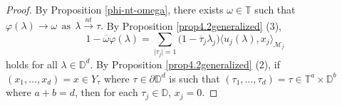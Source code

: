 \documentclass[10pt,a4paper]{amsart}
\begin{document}
\begin{proof}
 By Proposition \ref{phi-nt-omega},
there exists $\omega\in\mathbb{T}$ such that $\varphi(\lambda)\rightarrow \omega~~\text{as}~~\lambda{\overset{nt}\rightarrow}\tau.$ By Proposition \ref{prop4.2generalized} (3), 
\begin{equation}\label{omega-model}
  1-\overline{\omega}\varphi(\lambda)=\sum_{\lvert \tau_{j} \rvert = 1}\Big(1-\overline{\tau}_{j}\lambda_{j}\Big)\langle u_{j}(\lambda),x_{j}\rangle_{\mathcal{M}_{j}}
  \end{equation}
holds for all $\lambda\in\mathbb{D}^{d}$.
By Proposition \ref{prop4.2generalized} (2), if $(x_{1},\hdots,x_{d})=x\in Y_{\tau}$ where $\tau\in\partial\mathbb{D}^{d}$ is such that  $(\tau_{1},\hdots,\tau_{d})=\tau\in\mathbb{T}^{a}\times\mathbb{D}^{b}$ where $a+b=d$, then for each $\tau_{j}\in\mathbb{D}$, $x_{j}=0$.


\end{proof}
\end{document}
